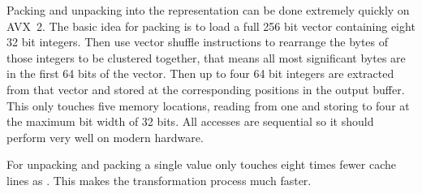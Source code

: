 Packing and unpacking into the \bs{} representation can be done extremely
quickly on AVX~2. The basic idea for packing is to load a full 256 bit vector
containing eight 32 bit integers. Then use vector shuffle instructions to
rearrange the bytes of those integers to be clustered together, that means all
most significant bytes are in the first 64 bits of the vector. Then up to four
64 bit integers are extracted from that vector and stored at the corresponding
positions in the output buffer. This only touches five memory locations, reading
from one and storing to four at the maximum bit width of 32 bits. All accesses
are sequential so it should perform very well on modern hardware.

For \bs{} unpacking and packing a single value only touches eight times fewer
cache lines as \bwv{}. This makes the transformation process much faster.
